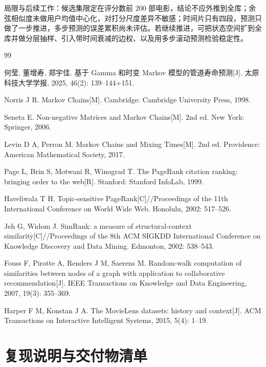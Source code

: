 \documentclass[12pt,a4paper]{ctexart}
\begin{document}
局限与后续工作：候选集限定在评分数前 $200$ 部电影，结论不应外推到全库；余弦相似度未做用户均值中心化，对打分尺度差异不敏感；时间片只有四段，预测只做了一步推进，多步预测的误差累积尚未评估。若继续推进，可把状态空间扩到全库并做分层抽样、引入带时间衰减的边权、以及用多步滚动预测检验稳定性。

\begin{thebibliography}{99}
\small
\setlength{\itemsep}{0.2em}

 何莹, 董增寿, 郑宇佳. 基于 Gamma 和时变 Markov 模型的管道寿命预测[J]. 太原科技大学学报, 2025, 46(2): 139--144+151.

 Norris J R. Markov Chains[M]. Cambridge: Cambridge University Press, 1998.

 Seneta E. Non-negative Matrices and Markov Chains[M]. 2nd ed. New York: Springer, 2006.

 Levin D A, Perron M. Markov Chains and Mixing Times[M]. 2nd ed. Providence: American Mathematical Society, 2017.

 Page L, Brin S, Motwani R, Winograd T. The PageRank citation ranking: bringing order to the web[R]. Stanford: Stanford InfoLab, 1999.

 Haveliwala T H. Topic-sensitive PageRank[C]//Proceedings of the 11th International Conference on World Wide Web. Honolulu, 2002: 517--526.

 Jeh G, Widom J. SimRank: a measure of structural-context similarity[C]//Proceedings of the 8th ACM SIGKDD International Conference on Knowledge Discovery and Data Mining. Edmonton, 2002: 538--543.

 Fouss F, Pirotte A, Renders J M, Saerens M. Random-walk computation of similarities between nodes of a graph with application to collaborative recommendation[J]. IEEE Transactions on Knowledge and Data Engineering, 2007, 19(3): 355--369.

 Harper F M, Konstan J A. The MovieLens datasets: history and context[J]. ACM Transactions on Interactive Intelligent Systems, 2015, 5(4): 1--19.

\end{thebibliography}

\newpage
\appendix
\section{复现说明与交付物清单}
\end{document}
